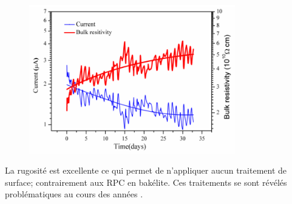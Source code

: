 \begin{figure}[ht!]
	\centering
	\includegraphics[width=0.80\textwidth]{GLA/resi.png}
	\label{resi}
\end{figure}

La rugosité est excellente ce qui permet de n'appliquer aucun traitement de surface; contrairement aux RPC en bakélite. Ces traitements se sont révélés problématiques au cours des années \cite{1352718}.

